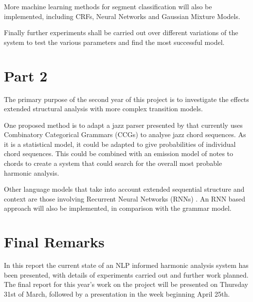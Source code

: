 \documentclass[bsc,singlespacing,parskip,deptreport,twoside,frontabs]{infthesis}
\begin{document}
More machine learning methods for segment classification will also be implemented, including CRFs, Neural Networks and Gaussian Mixture Models.

Finally further experiments shall be carried out over different variations of the system to test the various parameters and find the most successful model.

\section{Part 2}

The primary purpose of the second year of this project is to investigate the effects extended structural analysis with more complex transition models.

One proposed method is to adapt a jazz parser presented by \cite{ccg}
 that currently uses Combinatory Categorical Grammars (CCGs) to analyse jazz chord sequences. As it is a statistical model, it could be adapted to give probabilities of individual chord sequences. This could be combined with an emission model of notes to chords to create a system that could search for the overall most probable harmonic analysis.

Other language models that take into account extended sequential structure and context are those involving Recurrent Neural Networks (RNNs) \cite{rnn}. An RNN based approach will also be implemented, in comparison with the grammar model.

\section{Final Remarks}

In this report the current state of an NLP informed harmonic analysis system has been presented, with details of experiments carried out and further work planned. The final report for this year's work on the project will be presented on Thursday 31st of March, followed by a presentation in the week beginning April 25th.
\end{document}
